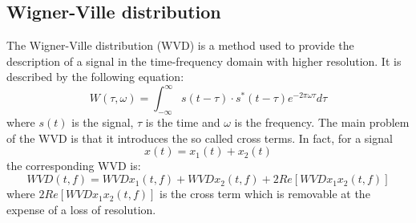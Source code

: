 \documentclass[a4paper, noexaminfo]{sapthesis}
\begin{document}
\subsection{Wigner-Ville distribution}\label{sec:wvd}
The Wigner-Ville distribution (WVD)\cite{wvd} is a method used to provide
the description of a signal in the time-frequency domain with higher resolution.
It is described by the following equation:
\begin{equation}
\label{eq:wvd}
W(\tau, \omega) = \int_{-\infty}^{\infty} s(t-\tau) \cdot s^*(t-\tau) e^{-2\pi\omega \tau} d\tau
\end{equation}
where $s(t)$ is the signal, $\tau$ is the time and $\omega$ is the frequency.
The main problem of the WVD is that it introduces the so called cross terms.
In fact, for a signal
\begin{equation} x(t)=x_1(t)+x_2(t)
\end{equation}
the corresponding WVD is:
\begin{equation}
WVD(t,f)= WVDx_1(t,f) + WVDx_2(t,f) + 2Re[WVDx_1x_2(t,f)]
\end{equation}
where $2Re[WVDx_1x_2(t,f)]$ is the cross term
which is removable at the expense of a loss of resolution.  \newline
\end{document}
